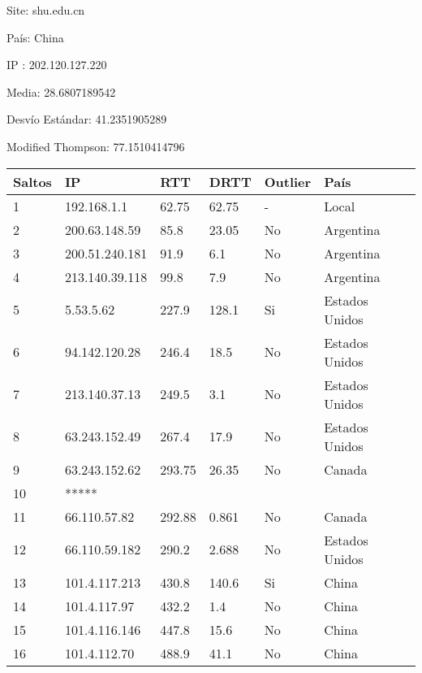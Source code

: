Site: shu.edu.cn

País: China

IP : 202.120.127.220

Media: 28.6807189542 

Desvío Estándar: 41.2351905289 

Modified Thompson: 77.1510414796

\begin{center}
    \begin{tabular}{| l | l | l | l | l | l | }
    \hline
    Saltos & IP             & RTT    & DRTT   & Outlier & País           \\ \hline
    1      & 192.168.1.1    & 62.75  & 62.75  & -       & Local          \\ \hline
    2      & 200.63.148.59  & 85.8   & 23.05  & No      & Argentina      \\ \hline
    3      & 200.51.240.181 & 91.9   & 6.1    & No      & Argentina      \\ \hline
    4      & 213.140.39.118 & 99.8   & 7.9    & No      & Argentina      \\ \hline
    5      & 5.53.5.62      & 227.9  & 128.1  & Si      & Estados Unidos \\ \hline
    6      & 94.142.120.28  & 246.4  & 18.5   & No      & Estados Unidos \\ \hline
    7      & 213.140.37.13  & 249.5  & 3.1    & No      & Estados Unidos \\ \hline
    8      & 63.243.152.49  & 267.4  & 17.9   & No      & Estados Unidos \\ \hline
    9      & 63.243.152.62  & 293.75 & 26.35  & No      & Canada         \\ \hline
   10      & *****          &        &        &         &                \\ \hline
   11      & 66.110.57.82   & 292.88 & 0.861  & No      & Canada         \\ \hline
   12      & 66.110.59.182  & 290.2  & 2.688  & No      & Estados Unidos \\ \hline
   13      & 101.4.117.213  & 430.8  & 140.6  & Si      & China          \\ \hline
   14      & 101.4.117.97   & 432.2  & 1.4    & No      & China          \\ \hline
   15      & 101.4.116.146  & 447.8  & 15.6   & No      & China          \\ \hline
   16      & 101.4.112.70   & 488.9  & 41.1   & No      & China          \\ \hline

\end{tabular}
\end{center}
